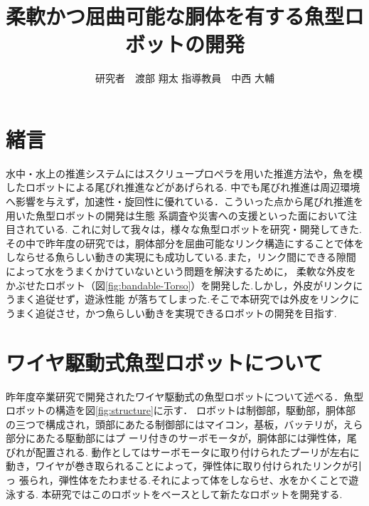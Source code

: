 \documentclass{jarticle}
\begin{document}

\title{
柔軟かつ屈曲可能な胴体を有する魚型ロボットの開発
}
\author{
研究者　渡部 翔太\;\;\;
指導教員　中西 大輔
}

\maketitle

\thispagestyle{empty}  %

\section{緒言}
水中・水上の推進システムにはスクリュープロペラを用いた推進方法や，魚を模したロボットによる尾びれ推進などがあげられる\cite{ichi}.
中でも尾びれ推進は周辺環境へ影響を与えず，加速性・旋回性に優れている．こういった点から尾びれ推進を用いた魚型ロボットの開発は生態
系調査や災害への支援といった面において注目されている\cite{ni}.
これに対して我々は，様々な魚型ロボットを研究・開発してきた.その中で昨年度の研究では，胴体部分を屈曲可能なリンク構造にすることで体を
しならせる魚らしい動きの実現にも成功している.また，リンク間にできる隙間によって水をうまくかけていないという問題を解決するために，
柔軟な外皮をかぶせたロボット（図\ref{fig:bandable-Torso}）を開発した\cite{san}.しかし，外皮がリンクにうまく追従せず，遊泳性能
が落ちてしまった.そこで本研究では外皮をリンクにうまく追従させ，かつ魚らしい動きを実現できるロボットの開発を目指す.


\section{ワイヤ駆動式魚型ロボットについて}
昨年度卒業研究で開発されたワイヤ駆動式の魚型ロボットについて述べる．魚型ロボットの構造を図\ref{fig:structure}に示す．
ロボットは制御部，駆動部，胴体部の三つで構成され，頭部にあたる制御部にはマイコン，基板，バッテリが，えら部分にあたる駆動部にはプ
ーリ付きのサーボモータが，胴体部には弾性体，尾びれが配置される.
動作としてはサーボモータに取り付けられたプーリが左右に動き，ワイヤが巻き取られることによって，弾性体に取り付けられたリンクが引っ
張られ，弾性体をたわませる.それによって体をしならせ、水をかくことで遊泳する.
本研究ではこのロボットをベースとして新たなロボットを開発する.
\end{document}
